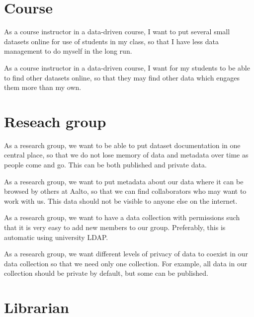 \section{Course}

\begin{compactitem}
    \item As a course instructor in a data-driven course, I want to put several
          small datasets online for use of students in my class, so that I have
          less data management to do myself in the long run.
    \item As a course instructor in a data-driven course, I want for my students
          to be able to find other datasets online, so that they may find other
          data which engages them more than my own.
\end{compactitem}

\section{Reseach group}

\begin{compactitem}
    \item As a research group, we want to be able to put dataset documentation
          in one central place, so that we do not lose memory of data and
          metadata over time as people come and go.  This can be both published
          and private data.
    \item As a research group, we want to put metadata about our data where it
          can be browsed by others at Aalto, so that we can find collaborators
          who may want to work with us.  This data should not be visible to
          anyone else on the internet.
    \item As a research group, we want to have a data collection with
          permissions such that it is very easy to add new members to our
          group. Preferably, this is automatic using university LDAP.
    \item As a research group, we want different levels of privacy of data to
          coexist in our data collection so that we need only one collection.
          For example, all data in our collection should be private by default,
          but some can be published.
\end{compactitem}

\section{Librarian}

